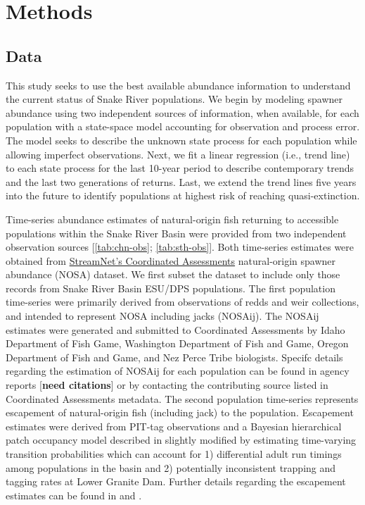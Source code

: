 \documentclass[10pt,a4paper]{article}
\begin{document}
\section{Methods}\label{methods}

\subsection{Data}\label{data}

This study seeks to use the best available abundance information to understand the current status of Snake River populations. We begin by modeling spawner abundance using two independent sources of information, when available, for each population with a state-space model accounting for observation and process error. The model seeks to describe the unknown state process for each population while allowing imperfect observations. Next, we fit a linear regression (i.e., trend line) to each state process for the last 10-year period to describe contemporary trends and the last two generations of returns. Last, we extend the trend lines five years into the future to identify populations at highest risk of reaching quasi-extinction.

Time-series abundance estimates of natural-origin fish returning to accessible populations within the Snake River Basin were provided from two independent observation sources {[}\ref{tab:chn-obs}; \ref{tab:sth-obs}{]}. Both time-series estimates were obtained from \href{https://cax.streamnet.org}{StreamNet's Coordinated Assessments} natural-origin spawner abundance (NOSA) dataset. We first subset the dataset to include only those records from Snake River Basin ESU/DPS populations. The first population time-series were primarily derived from observations of redds and weir collections, and intended to represent NOSA including jacks (NOSAij). The NOSAij estimates were generated and submitted to Coordinated Assessments by Idaho Department of Fish Game, Washington Department of Fish and Game, Oregon Department of Fish and Game, and Nez Perce Tribe biologists. Specifc details regarding the estimation of NOSAij for each population can be found in agency reports {[}\textbf{need citations}{]} or by contacting the contributing source listed in Coordinated Assessments metadata. The second population time-series represents escapement of natural-origin fish (including jack) to the population. Escapement estimates were derived from PIT-tag observations and a Bayesian hierarchical patch occupancy model described in \textcite{waterhouse_bayesian_2020} slightly modified by estimating time-varying transition probabilities which can account for 1) differential adult run timings among populations in the basin and 2) potentially inconsistent trapping and tagging rates at Lower Granite Dam. Further details regarding the escapement estimates can be found in \textcite{See2020} and \textcite{See2019}.
\end{document}
